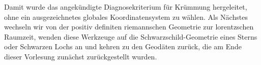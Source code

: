 Damit wurde das angekündigte Diagnosekriterium für Krümmung hergeleitet, ohne ein ausgezeichnetes globales Koordinatensystem zu wählen. Als Nächstes wechseln wir von der positiv definiten riemannschen Geometrie zur lorentzschen Raumzeit, wenden diese Werkzeuge auf die Schwarzschild-Geometrie eines Sterns oder Schwarzen Lochs an und kehren zu den Geodäten zurück, die am Ende dieser Vorlesung zunächst zurückgestellt wurden.